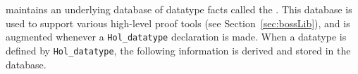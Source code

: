 %
%
%
%
%
%
%
%

%
\HOL{} maintains an underlying database of datatype facts called the
.  This database is used to support various high-level
proof tools (see Section~\ref{sec:bossLib}), and is augmented whenever
a \verb+Hol_datatype+ declaration is made.  When a datatype is defined by \verb+Hol_datatype+,
the following information is derived and stored in the database.

